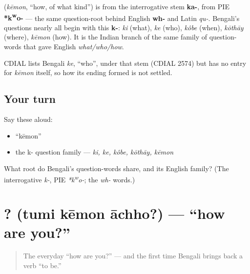 \begin{cousinweb}
\textbf{} (\emph{kēmon}, \textquotedblleft{}how, of what kind\textquotedblright{}) is from the interrogative stem \textbf{ka-}, from PIE \textbf{*k\textsuperscript{w}o-} — the same question-root behind English \textbf{wh-} and Latin \emph{qu-}. Bengali's questions nearly all begin with this \textbf{k-}: \emph{ki} (what), \emph{ke} (who), \emph{kôbe} (when), \emph{kōthāy} (where), \emph{kēmon} (how). It is the Indian branch of the same family of question-words that gave English \emph{what/who/how}.

CDIAL lists Bengali \emph{ke}, \textquotedblleft{}who\textquotedblright{}, under that stem (CDIAL 2574) but has no entry for \emph{kēmon} itself, so how its ending formed is not settled.
\end{cousinweb}

\subsection*{Your turn}
Say these aloud:

\begin{itemize}
\raggedright
  \item \textquotedblleft{}kēmon\textquotedblright{}
  \item the k- question family — \emph{ki, ke, kôbe, kōthāy, kēmon}
\end{itemize}

\begin{tcolorbox}[breakable,colback=teal!4,colframe=teal!35!black,title={Before you move on}]
What root do Bengali's question-words share, and its English family? (The interrogative \emph{k-}, PIE \emph{*k\textsuperscript{w}o-}; the \emph{wh-} words.)
\end{tcolorbox}
\section[\texorpdfstring{\bn{তুমি} \bn{কেমন} \bn{আছো}? (tumi kēmon āchho?)}{তুমি কেমন আছো? (tumi kēmon āchho?)}]{  ? (tumi kēmon āchho?) — \textquotedblleft{}how are you?\textquotedblright{}}

\label{lesson:BN-C03-tumi-kemon-achho}



\begin{quote}
The everyday \textquotedblleft{}how are you?\textquotedblright{} — and the first time Bengali brings back a verb \textquotedblleft{}to be.\textquotedblright{}
\end{quote}

